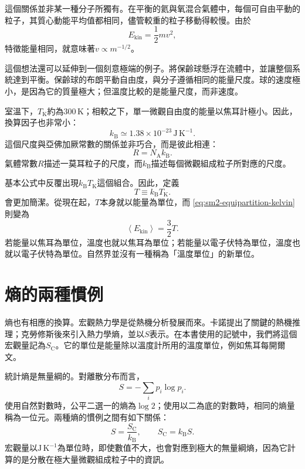 這個關係並非某一種分子所獨有。在平衡的氦與氧混合氣體中，每個可自由平動的粒子，其質心動能平均值都相同，儘管較重的粒子移動得較慢。由於
\begin{equation}
 E_{\mathrm{kin}}=\frac{1}{2}mv^2,
\end{equation}
特徵能量相同，就意味著\(v\propto m^{-1/2}\)。

這個想法還可以延伸到一個刻意極端的例子。將保齡球懸浮在流體中，並讓整個系統達到平衡。保齡球的布朗平動自由度，與分子遵循相同的能量尺度。球的速度極小，是因為它的質量極大；但溫度比較的是能量尺度，而非速度。

室溫下，\(T_{\mathrm K}\)約為\(300\,\mathrm K\)；相較之下，單一微觀自由度的能量以焦耳計極小。因此，換算因子也非常小：
\begin{equation}
 k_{\mathrm B}\simeq 1.38\times10^{-23}\,
 \mathrm{J\,K^{-1}}.
 \label{eq:sm2-boltzmann-value}
\end{equation}
這個尺度與亞佛加厥常數的關係並非巧合，而是彼此相連：
\begin{equation}
 R=N_{\mathrm A}k_{\mathrm B}.
\end{equation}
氣體常數\(R\)描述一莫耳粒子的尺度，而\(k_{\mathrm B}\)描述每個微觀組成粒子所對應的尺度。

基本公式中反覆出現\(k_{\mathrm B}T_{\mathrm K}\)這個組合。因此，定義
\begin{equation}
 T\equiv k_{\mathrm B}T_{\mathrm K}.
 \label{eq:sm2-energy-temperature}
\end{equation}
會更加簡潔。從現在起，\(T\)本身就以能量為單位，而
\eqref{eq:sm2-equipartition-kelvin}則變為
\begin{equation}
 \left\langle E_{\mathrm{kin}}\right\rangle=\frac{3}{2}T.
 \label{eq:sm2-equipartition-natural}
\end{equation}
若能量以焦耳為單位，溫度也就以焦耳為單位；若能量以電子伏特為單位，溫度也就以電子伏特為單位。自然界並沒有一種稱為「溫度單位」的新單位。

\section{熵的兩種慣例}

熵也有相應的換算。宏觀熱力學是從熱機分析發展而來。卡諾提出了關鍵的熱機推理；克勞修斯後來引入熱力學熵，並以\(S\)表示。在本書使用的記號中，我們將這個宏觀量記為\(S_{\mathrm C}\)。它的單位是能量除以溫度計所用的溫度單位，例如焦耳每開爾文。

統計熵是無量綱的。對離散分布而言，
\begin{equation}
 S=-\sum_i p_i\log p_i.
 \label{eq:sm2-statistical-entropy}
\end{equation}
使用自然對數時，公平二選一的熵為\(\log2\)；使用以二為底的對數時，相同的熵量稱為一位元。兩種熵的慣例之間有如下關係：
\begin{equation}
 S=\frac{S_{\mathrm C}}{k_{\mathrm B}},
 \qquad
 S_{\mathrm C}=k_{\mathrm B}S.
 \label{eq:sm2-entropy-conversion}
\end{equation}
宏觀量以\(\mathrm{J\,K^{-1}}\)為單位時，即使數值不大，也會對應到極大的無量綱熵，因為它計算的是分散在極大量微觀組成粒子中的資訊。

